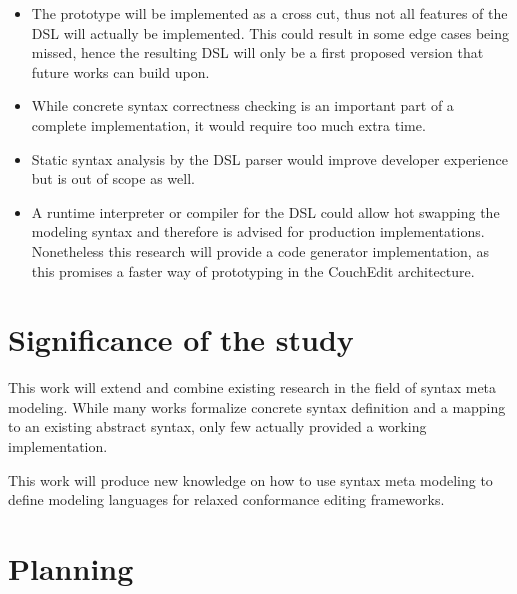 \documentclass[10pt,a4paper,oneside]{scrartcl}
\newcommand\hint[2]{
\ifthenelse{\boolean{showhints}}{
\begin{center}
\colorbox{black!10}{
\begin{minipage}{.963\textwidth}
#2\hfill\textbf{#1}
\end{minipage}
}\end{center}}{}
}
\begin{document}
\begin{itemize}
  \item The prototype will be implemented as a cross cut, thus not all features of the DSL will actually be implemented. This could result in some edge cases being missed, hence the resulting DSL will only be a first proposed version that future works can build upon.
  \item While concrete syntax correctness checking is an important part of a complete implementation, it would require too much extra time.
  \item Static syntax analysis by the DSL parser would improve developer experience but is out of scope as well.
  \item A runtime interpreter or compiler for the DSL could allow hot swapping the modeling syntax and therefore is advised for production implementations. Nonetheless this research will provide a code generator implementation, as this promises a faster way of prototyping in the CouchEdit architecture.
\end{itemize}

\section{Significance of the study}


This work will extend and combine existing research in the field of syntax meta modeling. While many works formalize concrete syntax definition and a mapping to an existing abstract syntax, only few actually provided a working implementation.

This work will produce new knowledge on how to use syntax meta modeling to define modeling languages for relaxed conformance editing frameworks.


\section{Planning}
\label{sec:planning}
\end{document}
